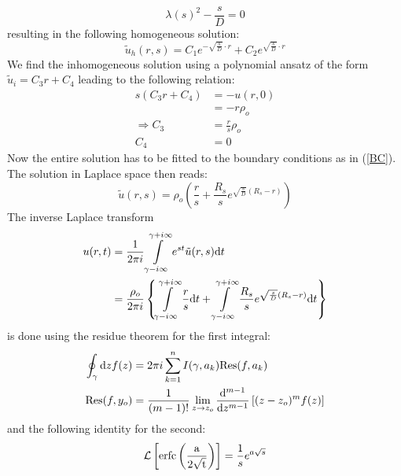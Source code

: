 \begin{equation}
    \lambda(s) ^2 - \frac{s}{D} = 0
    \label{characteristic_polynomial}
\end{equation}
resulting in the following homogeneous solution:
\begin{equation}
    \tilde{u}_h(r,s) = C_1 e^{ - \sqrt{\frac{s}{D}} \cdot r } + C_2 e^{ \sqrt{\frac{s}{D}} \cdot r }
    \label{u_h}
\end{equation}
We find the inhomogeneous solution using a polynomial ansatz of the form $\tilde{u}_i = C_3 r + C_4$ leading to the following relation:
\begin{align}
    s(C_3 r + C_4)  &= -u(r,0)\\
                    &= - r \rho_o \\
    \Rightarrow C_3 &= \frac{r}{s}\rho_o \\
                C_4 &= 0
\end{align}
Now the entire solution has to be fitted to the boundary conditions as in (\ref{BC}). The solution in Laplace space then reads:
\begin{equation}
\tilde{u}(r,s) = \rho_o \left( \frac{r}{s} + \frac{R_s}{s} e^{ \sqrt{\frac{s}{D}}(R_s - r) } \right) 
\end{equation}
The inverse Laplace transform
\begin{align}
    u(r,t)  &= \frac{1}{2 \pi i} \int\limits_{\gamma - i \infty}^{\gamma + i \infty}  e^{st} \tilde{u}(r,s){\rm d}t \\
    &= \frac{\rho_o}{ 2 \pi i} \left\{  \int\limits_{\gamma - i \infty}^{\gamma + i \infty} \frac{r}{s}  {\rm d}t +  \int\limits_{\gamma - i \infty}^{\gamma + i \infty}\frac{R_s}{s} e^{ \sqrt{\frac{s}{D}}(R_s - r) }  {\rm d}t \right\}
    \label{inverse laplace}
\end{align}
is done using the residue theorem for the first integral:
\begin{align}
    \oint_{ \gamma } {\rm d}z f(z) &= 2 \pi i \sum_{k = 1}^{n}I(\gamma, a_k) {\rm Res}(f,a_k) \\
    { \rm Res}(f,y_o) &= \frac{1}{(m-1)!} \lim_{z\rightarrow z_o} \frac{{ \rm d} ^{m-1}}{{\rm d} z^{m-1}} \left[ (z - z_o)^{m}f(z) \right]
    \label{residue theorem}
\end{align}
and the following identity for the second:
\begin{equation}
    \mathcal{L}\left[ {\rm erfc\left( \frac{a}{2\sqrt{t}} \right)} \right] = \frac{1}{s}e^{a\sqrt{s}}
    \label{L(erfc)}
\end{equation}

